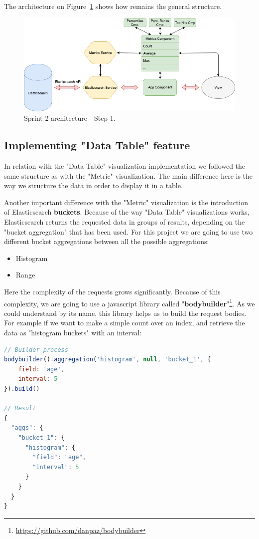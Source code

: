 \documentclass[a4paper, 12pt, english]{book}
\begin{document}
The architecture on Figure~\ref{fig:sprint2-architecture-1} shows how remains the general structure.
\begin{figure}
  \centering
  \includegraphics[width=13cm, keepaspectratio]{img/sprint2_architecture_1.png}
  \caption{Sprint 2 architecture - Step 1.}
  \label{fig:sprint2-architecture-1}
\end{figure}

\subsection{Implementing "Data Table" feature}
\label{sec:data-table-feature}
In relation with the "Data Table" visualization implementation we followed the same structure as with the "Metric" visualization. The main difference here is the way we structure the data in order to display it in a table.

Another important difference with the "Metric" visualization is the introduction of Elasticsearch \textbf{buckets}. Because of the way "Data Table" visualizations works, Elasticsearch returns the requested data in groups of results, depending on the "bucket aggregation" that has been used. For this project we are going to use two different bucket aggregations between all the possible aggregations:
\begin{itemize}
    \item Histogram
    \item Range
\end{itemize}

Here the complexity of the requests grows significantly. Because of this complexity, we are going to use a javascript library called "\textbf{bodybuilder}"\footnote{\url{https://github.com/danpaz/bodybuilder}}. As we could understand by its name, this library helps us to build the request bodies. For example if we want to make a simple count over an index, and retrieve the data as "histogram buckets" with an interval:
\begin{lstlisting}[language=javascript]
// Builder process
bodybuilder().aggregation('histogram', null, 'bucket_1', {
  	field: 'age',
	interval: 5
}).build()

// Result
{
  "aggs": {
    "bucket_1": {
      "histogram": {
        "field": "age",
        "interval": 5
      }
    }
  }
}
\end{lstlisting}
\end{document}
